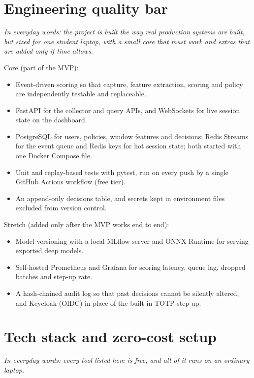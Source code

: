 \documentclass[10pt,letterpaper]{article}
\begin{document}
\section{Engineering quality bar}

\emph{In everyday words: the project is built the way real production systems are built, but sized for one student laptop, with a small core that must work and extras that are added only if time allows.}

Core (part of the MVP):
\begin{itemize}
  \item Event-driven scoring so that capture, feature extraction, scoring and policy are independently testable and replaceable.
  \item FastAPI for the collector and query APIs, and WebSockets for live session state on the dashboard.
  \item PostgreSQL for users, policies, window features and decisions; Redis Streams for the event queue and Redis keys for hot session state; both started with one Docker Compose file.
  \item Unit and replay-based tests with pytest, run on every push by a single GitHub Actions workflow (free tier).
  \item An append-only decisions table, and secrets kept in environment files excluded from version control.
\end{itemize}
Stretch (added only after the MVP works end to end):
\begin{itemize}
  \item Model versioning with a local MLflow server and ONNX Runtime for serving exported deep models.
  \item Self-hosted Prometheus and Grafana for scoring latency, queue lag, dropped batches and step-up rate.
  \item A hash-chained audit log so that past decisions cannot be silently altered, and Keycloak (OIDC) in place of the built-in TOTP step-up.
\end{itemize}

\section{Tech stack and zero-cost setup}

\emph{In everyday words: every tool listed here is free, and all of it runs on an ordinary laptop.}
\end{document}
